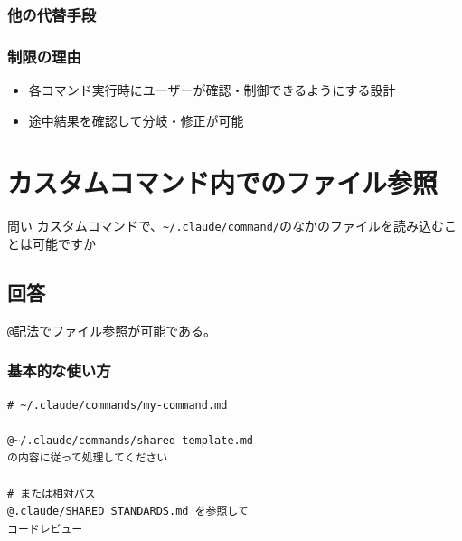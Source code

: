 \documentclass[a4paper,10pt,twocolumn]{ltjsarticle}
\begin{document}
\subsubsection{他の代替手段}

\vspace{0.5\baselineskip}
\vspace{0.5\baselineskip}

\subsubsection{制限の理由}

\begin{itemize}
  \item 各コマンド実行時にユーザーが確認・制御できるようにする設計
  \item 途中結果を確認して分岐・修正が可能
\end{itemize}

\section{カスタムコマンド内でのファイル参照}

\begin{itembox}[l]{問い}
カスタムコマンドで、\texttt{\textasciitilde/.claude/command/}のなかのファイルを読み込むことは可能ですか
\end{itembox}

\subsection{回答}

\texttt{@}記法でファイル参照が可能である。

\subsubsection{基本的な使い方}

\begin{lstlisting}[language={}]
# ~/.claude/commands/my-command.md

@~/.claude/commands/shared-template.md
の内容に従って処理してください

# または相対パス
@.claude/SHARED_STANDARDS.md を参照して
コードレビュー
\end{lstlisting}
\end{document}
